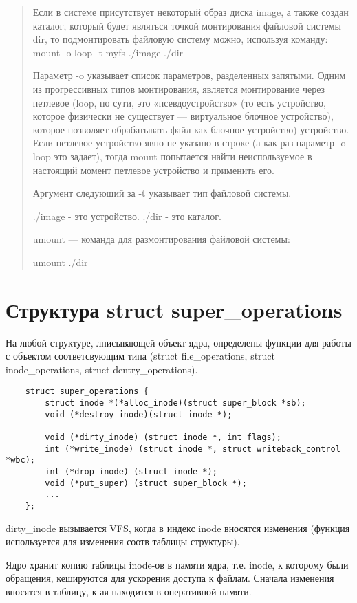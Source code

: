 \begin{quote}
	Если в системе присутствует некоторый образ диска image, а также создан каталог, который будет являться точкой монтирования файловой системы dir, то подмонтировать файловую систему можно, используя команду: mount -o loop -t myfs ./image ./dir
	
	Параметр -o указывает список параметров, разделенных запятыми. Одним из прогрессивных типов монтирования, является монтирование через петлевое (loop, по сути, это «псевдоустройство» (то есть устройство, которое физически не существует --- виртуальное блочное устройство), которое позволяет обрабатывать файл как блочное устройство) устройство. Если петлевое устройство явно не указано в строке (а как раз параметр -o loop это задает), тогда mount попытается найти неиспользуемое в настоящий момент петлевое устройство и применить его.
	
	Аргумент следующий за -t указывает тип файловой системы.
	
	./image - это устройство. ./dir - это каталог.
	
	umount — команда для размонтирования файловой системы:
	
	umount ./dir
\end{quote}


\section{Структура struct super\_operations}
На любой структуре, лписывающей объект ядра, определены функции для работы с объектом соответсвующим типа (struct file\_operations, struct inode\_operations, struct dentry\_operations).

\begin{lstlisting}
	struct super_operations {
		struct inode *(*alloc_inode)(struct super_block *sb);
		void (*destroy_inode)(struct inode *);
		
		void (*dirty_inode) (struct inode *, int flags);
		int (*write_inode) (struct inode *, struct writeback_control *wbc);
		int (*drop_inode) (struct inode *);
		void (*put_super) (struct super_block *);
		...
	};
\end{lstlisting}

dirty\_inode вызывается VFS, когда в индекс inode вносятся изменения (функция используется для изменения соотв таблицы структуры).

Ядро хранит копию таблицы inode-ов в памяти ядра, т.е. inode, к которому были обращения, кешируются для ускорения доступа к файлам. Сначала изменения вносятся в таблицу, к-ая находится в оперативной памяти.

